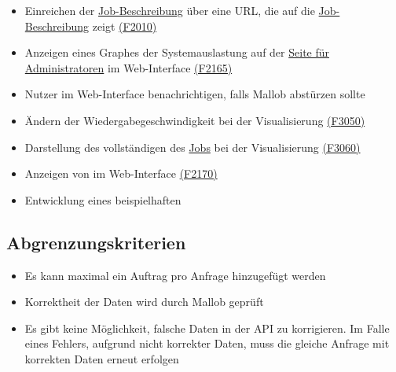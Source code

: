 \begin{itemize}[noitemsep]
        \item Einreichen der \hyperref[B:Job-Beschreibung]{Job-Beschreibung} über eine \gls{URL}, die auf die \hyperref[B:Job-Beschreibung]{Job-Beschreibung} zeigt \hyperref[FA:Web-Interface:Job einreichen]{(F2010)}
        \item Anzeigen eines Graphes der Systemauslastung auf der \hyperref[pages:admin]{Seite für Administratoren} im \gls{Web-Interface} \hyperref[FA:Web-Interface:Anzeigen von Diagnosedaten]{(F2165)}
        \item \gls{Nutzer} im \gls{Web-Interface} benachrichtigen, falls \gls{Mallob} abstürzen sollte 
        \item Ändern der Wiedergabegeschwindigkeit bei der Visualisierung \hyperref[FA:Visualisierung:Aendern der Wiedergabegeschwindigkeit]{(F3050)}
        \item Darstellung des vollständigen  des \hyperref[B:Jobs]{Jobs} bei der Visualisierung \hyperref[FA:Visualisierung:Anzeigen des Binaerbaumes für einen Job]{(F3060)}
        \item Anzeigen von  im \gls{Web-Interface} \hyperref[FA:Web-Interface:Anzeigen von Plugins]{(F2170)}
        \item Entwicklung eines beispielhaften 
    \end{itemize}
    
\subsection{Abgrenzungskriterien}
    \begin{itemize}[noitemsep]
        \item Es kann maximal ein Auftrag pro Anfrage hinzugefügt werden
        \item Korrektheit der Daten wird durch \gls{Mallob} geprüft
        \item Es gibt keine Möglichkeit, falsche Daten in der \gls{API} zu korrigieren. Im Falle eines Fehlers, aufgrund nicht korrekter Daten, muss die gleiche Anfrage mit korrekten Daten erneut erfolgen
    \end{itemize}
